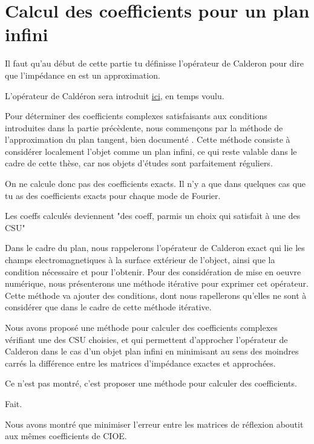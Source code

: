 \chapter{Calcul des coefficients pour un plan infini}
\label{sec:plan}
\minitoc
\newpage
\begin{REM}
  Il faut qu'au début de cette partie tu définisse l’opérateur de Calderon pour dire que l’impédance en est un approximation.
\end{REM}
\begin{REP}
    L'opérateur de Caldéron sera introduit \hyperlink{calderon}{ici}, en temps voulu.
\end{REP}
Pour déterminer des coefficients complexes satisfaisants aux conditions introduites dans la partie précèdente, nous commençons par la méthode de l'approximation du plan tangent, bien documenté \cite{hoppe_impedance_1995,marceaux_high-order_2000,aubakirov_electromagnetic_2014}. Cette méthode consiste à considérer localement l'objet comme un plan infini, ce qui reste valable dans le cadre de cette thèse, car nos objets d'études sont parfaitement réguliers.
\begin{REM}
    On ne calcule donc pas des coefficients exacts. Il n'y a que dans quelques cas que tu as des coefficients exacts pour chaque mode de Fourier.
\end{REM}
\begin{REP}
    Les coeffs calculés deviennent "des coeff, parmis un choix qui satisfait à une des CSU"
\end{REP}

Dans le cadre du plan, nous rappelerons l'opérateur de Calderon exact qui lie les champs electromagnetiques à la surface extérieur de l'object, ainsi que la condition nécessaire et pour l'obtenir.
Pour des considération de mise en oeuvre numérique, nous présenterons une méthode itérative pour exprimer cet opérateur.
Cette méthode va ajouter des conditions, dont nous rapellerons qu'elles ne sont à considérer que dans le cadre de cette méthode itérative.








Nous avons proposé une méthode pour calculer des coefficients complexes vérifiant une des CSU choisies, et qui permettent d'approcher l'opérateur de Calderon dans le cas d'un objet plan infini en minimisant au sens des moindres carrés la différence entre les matrices d'impédance exactes et approchées.
\begin{REM}
    Ce n'est pas montré, c'est proposer une méthode pour calculer des coefficients.
\end{REM}
\begin{REP}
    Fait.
\end{REP}
Nous avons montré que minimiser l'erreur entre les matrices de réflexion aboutit aux mêmes coefficients de CIOE.

